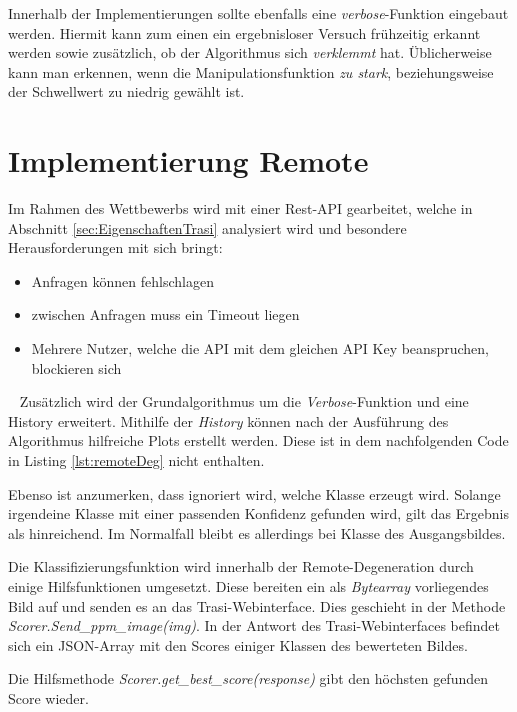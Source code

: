 Innerhalb der Implementierungen sollte ebenfalls eine \textit{verbose}-Funktion eingebaut werden. 
Hiermit kann zum einen ein ergebnisloser Versuch frühzeitig erkannt werden sowie zusätzlich, ob der Algorithmus sich \textit{verklemmt} hat. 
Üblicherweise kann man erkennen, wenn die Manipulationsfunktion \textit{zu stark}, beziehungsweise der Schwellwert zu niedrig gewählt ist.

\section{Implementierung Remote}
\label{sec:DegenerationRemote}
Im Rahmen des Wettbewerbs wird mit einer Rest-API gearbeitet, welche in Abschnitt \ref{sec:EigenschaftenTrasi} analysiert wird und besondere Herausforderungen mit sich bringt: 

\begin{itemize}
	\item Anfragen können fehlschlagen
	\item zwischen Anfragen muss ein Timeout liegen
	\item Mehrere Nutzer, welche die API mit dem gleichen API Key beanspruchen, blockieren sich
\end{itemize}
~\newline
Zusätzlich wird der Grundalgorithmus um die \textit{Verbose}-Funktion und eine History erweitert. Mithilfe der \textit{History} können nach der Ausführung des Algorithmus hilfreiche Plots erstellt werden. 
Diese ist in dem nachfolgenden Code in Listing \ref{lst:remoteDeg} nicht enthalten.
 
Ebenso ist anzumerken, dass ignoriert wird, welche Klasse erzeugt wird. 
Solange irgendeine Klasse mit einer passenden Konfidenz gefunden wird, gilt das Ergebnis als hinreichend. 
Im Normalfall bleibt es allerdings bei Klasse des Ausgangsbildes. 

Die Klassifizierungsfunktion wird innerhalb der Remote-Degeneration durch einige Hilfsfunktionen umgesetzt. 
Diese bereiten ein als \textit{Bytearray} vorliegendes Bild auf und senden es an das Trasi-Webinterface. 
Dies geschieht in der Methode \textit{Scorer.Send\_ppm\_image(img)}. 
In der Antwort des Trasi-Webinterfaces befindet sich ein JSON-Array mit den Scores einiger Klassen des bewerteten Bildes. 

Die Hilfsmethode \textit{Scorer.get\_best\_score(response)} gibt den höchsten gefunden Score wieder.
\newpage
\begin{scriptsize}
\end{scriptsize}
\newpage
